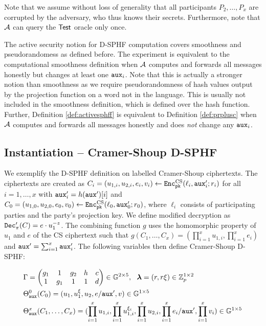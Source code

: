 \noindent
Note that we assume without loss of generality that all participants $P_2,\dots,P_x$ are corrupted by the adversary, who thus knows their secrets.
Furthermore, note that $\mathcal{A}$ can query the $\mathsf{Test}$ oracle only once.

The active security notion for \ac{D-SPHF} computation covers smoothness and pseudorandomess as defined before.
The experiment is equivalent to the computational smoothness definition when $\mathcal{A}$ computes and forwards all messages honestly but changes at least one $\mathtt{aux}_i$.
Note that this is actually a stronger notion than smoothness as we require pseudorandomness of hash values output by the projection function on a word not in the language.
This is usually not included in the smoothness definition, which is defined over the hash function.
Further, Definition \ref{def:activesphff} is equivalent to Definition \ref{def:prplusc} when $\mathcal{A}$ computes and forwards all messages honestly and does \emph{not} change any $\mathtt{aux}_i$.

\subsection{Instantiation -- Cramer-Shoup D-SPHF}\label{sec:dcssphf}
We exemplify the \ac{D-SPHF} definition on labelled Cramer-Shoup ciphertexts.
The ciphertexts are created as $C_i=(u_{1,i},u_{2,i},e_{i},v_i)\gets\mathtt{Enc}^{\mathrm{CS}}_{\mathtt{pk}}(\ell_i,\mathtt{aux}'_i;r_i)$ for all $i=1,\dots,x$ with $\mathtt{aux}'_i=h(\mathtt{aux}')[i]$ and $C_0=(u_{1,0},u_{2,0},\allowbreak e_{0},v_0)\gets\mathtt{Enc}^{\mathrm{CS}}_{\mathtt{pk}}(\ell_0,\allowbreak \mathtt{aux}'_0;r_0)$, where $\ell_i$ consists of participating parties and the party's projection key.
We define modified decryption as $\mathtt{Dec}'_\pi(C)=e\cdot u_1^{-z}$.
The combining function $g$ uses the homomorphic property of $u_1$ and $e$ of the CS ciphertext such that $g(C_1,\dots,C_x)=(\prod^x_{i=1}u_{1,i},\prod^x_{i=1}e_i)$ and $\mathtt{aux}'=\sum_{i=1}^{x}\mathtt{aux}'_i$.
The following variables then define Cramer-Shoup \ac{D-SPHF}:

\begin{align*}
& \Gamma=
		\begin{pmatrix}
			g_1 & 1 & g_2 & h & c \\
			1 & g_1 & 1 & 1 & d
		\end{pmatrix} \in \mathbb{G}^{2\times 5},~~
		{\bm \lambda}=(r, r\xi)\in\mathbb{Z}_p^{1\times 2} \\
& \Theta^0_{\mathtt{aux}}(C_0)=(u_1,u_1^\xi,u_2,e/\mathtt{aux}',v)\in\mathbb{G}^{1\times 5} \\
& \Theta^x_{\mathtt{aux}}(C_1,\dots,C_x)=(\prod^x_{i=1}u_{1,i},\prod^x_{i=1}u_{1,i}^{\xi_i},\prod^x_{i=1}u_{2,i},\prod^x_{i=1}e_i/\mathtt{aux}',\prod^x_{i=1}v_i)\in\mathbb{G}^{1\times 5}
\end{align*}

